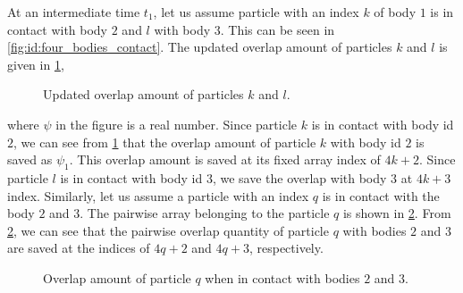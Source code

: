 At an intermediate time $t_1$, let us assume particle with an index $k$ of body
$1$ is in contact with body $2$ and $l$ with body $3$. This can be seen in
\cref{fig:id:four_bodies_contact}. The updated overlap amount of particles $k$
and $l$ is given in \cref{fig:id:k_f_overlap_t_1},
\begin{figure}[!htpb]
  \centering
  \footnotesize
  \caption{Updated overlap amount of particles $k$ and $l$.}
\label{fig:id:k_f_overlap_t_1}
\end{figure}
where $\psi$ in the figure is a real number. Since particle $k$ is in contact
with body id $2$, we can see from \cref{fig:id:k_f_overlap_t_1} that the overlap
amount of particle $k$ with body id $2$ is saved as $\psi_1$. This overlap
amount is saved at its fixed array index of $4k+2$. Since particle $l$ is in
contact with body id $3$, we save the overlap with body $3$ at $4k+3$ index.
Similarly, let us assume a particle with an index $q$ is in contact with the
body $2$ and $3$. The pairwise array belonging to the particle $q$ is shown in
\cref{fig:id:overlap_of_q_at_t_1}. From \cref{fig:id:overlap_of_q_at_t_1}, we
can see that the pairwise overlap quantity of particle $q$ with bodies $2$ and
$3$ are saved at the indices of $4q+2$ and $4q+3$, respectively.
\begin{figure}[!htpb]
  \centering
  \footnotesize
  \caption{Overlap amount of particle $q$ when in contact with bodies $2$ and $3$.}
  \label{fig:id:overlap_of_q_at_t_1}
\end{figure}


